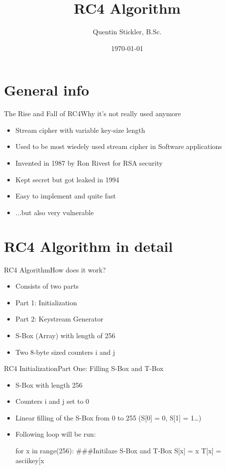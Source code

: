 \documentclass[
	aspectratio=169,	%
	onlytextwidth,		%
	t,					%
	]{beamer}
\title[RC4-Algorithmus]{RC4 Algorithm}
\author[Quentin Stickler]{Quentin Stickler, B.Sc.}
\date{\today} %
\begin{document}
\section{General info}

\begin{frame}[fragile]{The Rise and Fall of RC4}{Why it's not really used anymore}
	\begin{itemize}
		\item Stream cipher with variable key-size length
		\item Used to be most wiedely used stream cipher in Software applications
		\item Invented in 1987 by Ron Rivest for RSA security
		\item Kept secret but got leaked in 1994
		\item Easy to implement and quite fast
		\item ...but also very vulnerable
		
	\end{itemize}
\end{frame}

\section{RC4 Algorithm in detail}

\begin{frame}[fragile]{RC4 Algorithm}{How does it work?}
	\begin{itemize}
		\item Consists of two parts
		\item Part 1: Initialization
		\item Part 2: Keystream Generator
		\item S-Box (Array) with length of 256
		\item Two 8-byte sized counters i and j
	\end{itemize}
\end{frame}

\begin{frame}[fragile]{RC4 Initialization}{Part One: Filling S-Box and T-Box}
	\begin{itemize}
		\item S-Box with length 256
		\item Counters i and j set to 0
		\item Linear filling of the S-Box from 0 to 255 (S[0] = 0, S[1] = 1\dots)
		\item Following loop will be run:

		\begin{python}
			for x in range(256):		###Initilaze S-Box and T-Box
			S[x] = x
			T[x] = asciikey[x %
		\end{python}
		
	\end{itemize}
\end{frame}
\end{document}
